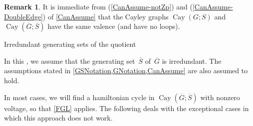 \documentclass[]{amcjoucc}
\makeatletter
\newcommand{\pref}[1]{(\ref{#1})}
\theoremstyle{plain}
\theoremstyle{definition}
\theoremstyle{definition}
\newtheorem{rem}[equation]{Remark}
\DeclareMathOperator{\Cay}{Cay}
\newcommand{\quot}{\overline}
\renewcommand{\section}{%
\@startsection{section}{1}{0pt}{-\baselineskip}{0.5\baselineskip}{\large\bfseries}%
}
\makeatother
\begin{document}
\begin{rem}
It is immediate from \pref{CanAssume-notZp} and \pref{CanAssume-DoubleEdge} of \cref{CanAssume} that the Cayley graphs $\Cay(G;S)$ and $\Cay(\quot G; \quot S)$ have the same valence (and have no loops).
\end{rem}






 



\section{Irredundant generating sets of the quotient} \label{IrredundantSect}

In this , we assume that the generating set~$\quot S$ of~$\quot G$ is irredundant.
The assumptions stated in \cref{GSNotation,GNotation,CanAssume} are also assumed to hold. 

In most cases, we will find a hamiltonian cycle in $\Cay(\quot G; \quot S)$ with nonzero voltage, so that \cref{FGL} applies. The following  deals with the exceptional cases in which this approach does not work.
\end{document}
